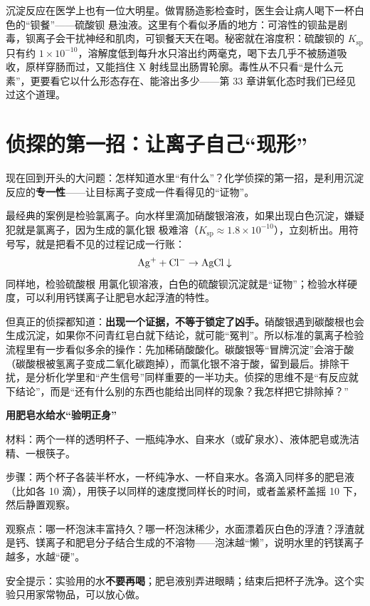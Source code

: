 沉淀反应在医学上也有一位大明星。做胃肠造影检查时，医生会让病人喝下一杯白色的“钡餐”——硫酸钡  悬浊液。这里有个看似矛盾的地方：可溶性的钡盐是剧毒，钡离子会干扰神经和肌肉，可钡餐天天在喝。秘密就在溶度积：硫酸钡的 $K_{\mathrm{sp}}$ 只有约 $1\times10^{-10}$，溶解度低到每升水只溶出约两毫克，喝下去几乎不被肠道吸收，原样穿肠而过，又能挡住 X 射线显出肠胃轮廓。毒性从不只看“是什么元素”，更要看它以什么形态存在、能溶出多少——第 33 章讲氧化态时我们已经见过这个道理。

\section{侦探的第一招：让离子自己“现形”}

现在回到开头的大问题：怎样知道水里“有什么”？化学侦探的第一招，是利用沉淀反应的\textbf{专一性}——让目标离子变成一件看得见的“证物”。

最经典的案例是检验氯离子。向水样里滴加硝酸银溶液，如果出现白色沉淀，嫌疑犯就是氯离子，因为生成的氯化银  极难溶（$K_{\mathrm{sp}}\approx1.8\times10^{-10}$），立刻析出。用符号写，就是把看不见的过程记成一行账：
\[\mathrm{Ag^+} + \mathrm{Cl^-} \rightarrow \mathrm{AgCl}\downarrow\]
同样地，检验硫酸根  用氯化钡溶液，白色的硫酸钡沉淀就是“证物”；检验水样硬度，可以利用钙镁离子让肥皂水起浮渣的特性。

但真正的侦探都知道：\textbf{出现一个证据，不等于锁定了凶手。}硝酸银遇到碳酸根也会生成沉淀，如果你不问青红皂白就下结论，就可能“冤判”。所以标准的氯离子检验流程里有一步看似多余的操作：先加稀硝酸酸化。碳酸银等“冒牌沉淀”会溶于酸（碳酸根被氢离子变成二氧化碳跑掉），而氯化银不溶于酸，留到最后。排除干扰，是分析化学里和“产生信号”同样重要的一半功夫。侦探的思维不是“有反应就下结论”，而是“还有什么别的东西也能给出同样的现象？我怎样把它排除掉？”

\begin{shiyan}
\textbf{用肥皂水给水“验明正身”}

材料：两个一样的透明杯子、一瓶纯净水、自来水（或矿泉水）、液体肥皂或洗洁精、一根筷子。

步骤：两个杯子各装半杯水，一杯纯净水、一杯自来水。各滴入同样多的肥皂液（比如各 10 滴），用筷子以同样的速度搅同样长的时间，或者盖紧杯盖摇 10 下，然后静置观察。

观察点：哪一杯泡沫丰富持久？哪一杯泡沫稀少，水面漂着灰白色的浮渣？浮渣就是钙、镁离子和肥皂分子结合生成的不溶物——泡沫越“懒”，说明水里的钙镁离子越多，水越“硬”。

安全提示：实验用的水\textbf{不要再喝}；肥皂液别弄进眼睛；结束后把杯子洗净。这个实验只用家常物品，可以放心做。
\end{shiyan}

